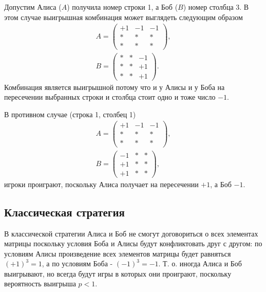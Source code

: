 \begin{example}
Допустим Алиса ($A$) получила номер строки 1, а Боб ($B$) номер
столбца 3. В этом случае выигрышная комбинация может выглядеть
следующим образом  
\begin{eqnarray}
A = \left(
\begin{array}{ccc}
+1 & -1 & -1 \\
\ast & \ast & \ast \\
\ast & \ast & \ast  
\end{array}
\right),
\nonumber \\
B = \left(
\begin{array}{ccc}
\ast & \ast & -1 \\
\ast & \ast & +1 \\
\ast & \ast & +1  
\end{array}
\right).
\nonumber 
\end{eqnarray}
Комбинация является выигрышной потому что и у Алисы и у Боба на
пересечении выбранных строки и столбца стоит одно и тоже число $-1$. 


В противном случае (строка 1, столбец 1) 
\begin{eqnarray}
A = \left(
\begin{array}{ccc}
+1 & -1 & -1 \\
\ast & \ast & \ast \\
\ast & \ast & \ast  
\end{array}
\right),
\nonumber \\
B = \left(
\begin{array}{ccc}
-1 & \ast & \ast \\
+1 & \ast & \ast \\
+1 & \ast & \ast  
\end{array}
\right),
\nonumber 
\end{eqnarray}
игроки проиграют, поскольку Алиса получает на пересечении $+1$, а Боб
$-1$. 
\end{example}


\subsection{Классическая стратегия}
В классической стратегии Алиса и Боб не смогут договориться о всех
элементах матрицы поскольку условия Боба и Алисы будут конфликтовать
друг с другом: по условиям Алисы произведение всех элементов матрицы
будет равняться $(+1)^3 = 1$, а по условиям Боба - $(-1)^3 = -1$.
Т. о. иногда Алиса и Боб выигрывают, но всегда будут игры в которых
они проиграют, поскольку вероятность выигрыша $p < 1$.

